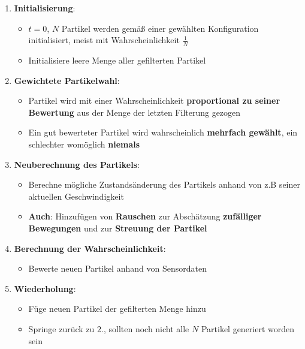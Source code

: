 \begin{enumerate}
	\item \textbf{Initialisierung}:
	\begin{itemize}
		\item $t = 0$, $N$ Partikel werden gemäß einer gewählten Konfiguration initialisiert, meist mit Wahrscheinlichkeit $\frac{1}{N}$
		\item Initialisiere leere Menge aller gefilterten Partikel
	\end{itemize}
	\item \textbf{Gewichtete Partikelwahl}:
	\begin{itemize}
		\item Partikel wird mit einer Wahrscheinlichkeit \textbf{proportional zu seiner Bewertung} aus der Menge der letzten Filterung gezogen
		\item Ein gut bewerteter Partikel wird wahrscheinlich \textbf{mehrfach gewählt}, ein schlechter womöglich \textbf{niemals}
	\end{itemize}
	\item \textbf{Neuberechnung des Partikels}:
	\begin{itemize}
		\item Berechne mögliche Zustandsänderung des Partikels anhand von z.B seiner aktuellen Geschwindigkeit
		\item \textbf{Auch}: Hinzufügen von \textbf{Rauschen} zur Abschätzung \textbf{zufälliger Bewegungen} und zur \textbf{Streuung der Partikel}
	\end{itemize}
	\item \textbf{Berechnung der Wahrscheinlichkeit}:
	\begin{itemize}
		\item Bewerte neuen Partikel anhand von Sensordaten
	\end{itemize}
	\item \textbf{Wiederholung}:
	\begin{itemize}
		\item Füge neuen Partikel der gefilterten Menge hinzu
		\item Springe zurück zu $2.$, sollten noch nicht alle $N$ Partikel generiert worden sein
	\end{itemize}
\end{enumerate}